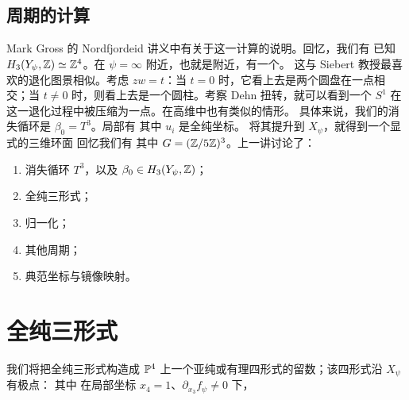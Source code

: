 \subsection{周期的计算}
Mark Gross 的 Nordfjordeid 讲义中有关于这一计算的说明。回忆，我们有
已知 $H_3(Y_\psi,\mathbb Z)\simeq\mathbb Z^4$。在 $\psi=\infty$ 附近，也就是附近，有一个。
这与 Siebert 教授最喜欢的退化图景相似。考虑 $zw=t$：当 $t=0$ 时，它看上去是两个圆盘在一点相交；当 $t\ne0$ 时，则看上去是一个圆柱。考察 Dehn 扭转，就可以看到一个 $S^1$ 在这一退化过程中被压缩为一点。在高维中也有类似的情形。
具体来说，我们的消失循环是 $\beta_0=T^3$。局部有
其中 $u_i$ 是全纯坐标。
将其提升到 $X_\psi$，就得到一个显式的三维环面
回忆我们有
其中 $G=(\mathbb Z/5\mathbb Z)^3$。上一讲讨论了：
\begin{enumerate}
\item 消失循环 $T^3$，以及 $\beta_0\in H_3(Y_\psi,\mathbb Z)$；
\item 全纯三形式；
\item 归一化；
\item 其他周期；
\item 典范坐标与镜像映射。
\end{enumerate}
\section{全纯三形式}
我们将把全纯三形式构造成 $\mathbb P^4$ 上一个亚纯或有理四形式的留数；该四形式沿 $X_\psi$ 有极点：
其中
在局部坐标 $x_4=1$、$\partial_{x_3}f_\psi\ne0$ 下，
